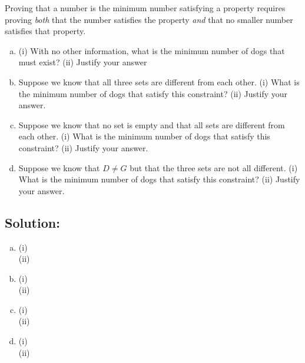 \documentclass[12pt]{article}
\begin{document}
Proving that a number is  the minimum number satisfying  a property requires proving {\em both} that the number satisfies the property {\em and} that no smaller number satisfies that property.


\begin{enumerate}[(a)]
    \item (i) With no other information, what is the minimum number of dogs that must exist? (ii) Justify your answer

\item 	Suppose we know that all three  sets are different from each other.
(i) What is the minimum number of dogs that satisfy this constraint? (ii)   Justify your answer.

\item Suppose we know that no set is empty and that all sets are different from each other.
(i) What is the minimum number of dogs that satisfy this constraint? (ii)   Justify your answer.

\item 	Suppose we know that  $D \neq G$  but that the three sets are not all different.
(i) What is the minimum number of dogs that satisfy this constraint? (ii)   Justify your answer.

\end{enumerate}

\subsection*{\textbf{Solution:}}

\begin{enumerate}[(a)]
\item (i)\\
(ii)

\item (i)\\
(ii)

\item (i)\\
(ii)

\item (i)\\
(ii)
 
\end{enumerate}



\newpage
\end{document}
